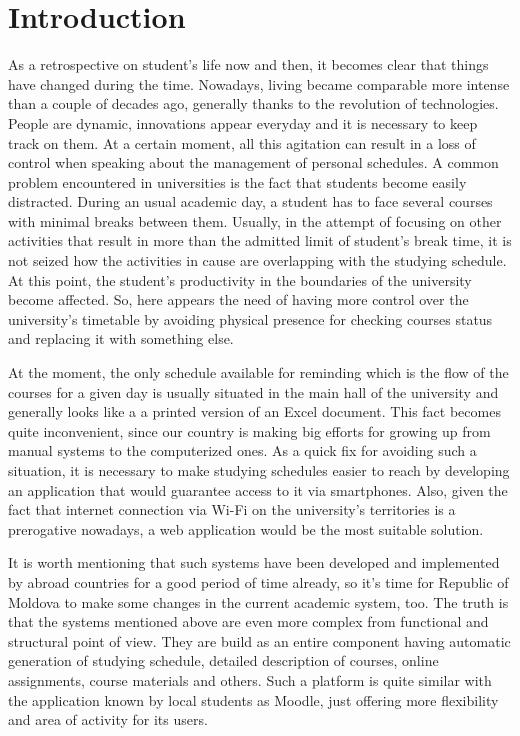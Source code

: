 \section*{Introduction}
As a retrospective on student's life now and then, it becomes clear that things have changed during the time. Nowadays, living became comparable more intense than a couple of decades ago, generally thanks to the revolution of technologies. People are dynamic, innovations appear everyday and it is necessary to keep track on them. At a certain moment, all this agitation can result in a loss of control when speaking about the management of personal schedules. A common problem encountered in universities is the fact that students become easily distracted. During an usual academic day, a student has to face several courses with minimal breaks between them. Usually, in the attempt of focusing on other activities that result in more than the admitted limit of student's break time, it is not seized how the activities in cause are overlapping with the studying schedule. At this point, the student's productivity in the boundaries of the university become affected. So, here appears the need of having more control over the university's timetable by avoiding physical presence for checking courses status and replacing it with something else. 

At the moment, the only schedule available for reminding which is the flow of the courses for a given day is usually situated in the main hall of the university and generally looks like a a printed version of an Excel document. This fact becomes quite inconvenient, since our country is making big efforts for growing up from manual systems to the computerized ones. As a quick fix for avoiding such a situation, it is necessary to make studying schedules easier to reach by developing an application that would guarantee access to it via smartphones. Also, given the fact that internet connection via Wi-Fi on the university's territories is a prerogative nowadays, a web application would be the most suitable solution. 

It is worth mentioning that such systems have been developed and implemented by abroad countries for a good period of time already, so it's time for Republic of Moldova to make some changes in the current academic system, too. The truth is that the systems mentioned above are even more complex from functional and structural point of view. They are build as an entire component having automatic generation of studying schedule, detailed description of courses, online assignments, course materials and others. Such a platform is quite similar with the application known by local students as Moodle, just offering more flexibility and area of activity for its users.

